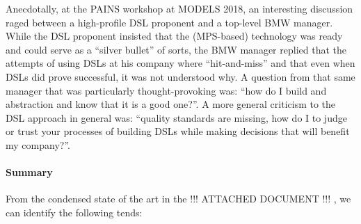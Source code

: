 \documentclass{article}
\begin{document}
% 
 

Anecdotally, at the PAINS workshop at MODELS 2018, an interesting discussion
raged between a high-profile DSL proponent and a top-level BMW manager. While
the DSL proponent insisted that the (MPS-based) technology was ready and could
serve as a ``silver bullet'' of sorts, the BMW manager replied that the attempts of using
DSLs at his company where ``hit-and-miss'' and that even when DSLs did prove
successful, it was not understood why. A question from that same manager that
was particularly thought-provoking was: ``how do I build and abstraction and
know that it is a good one?''. A more general criticism to the DSL approach in
general was: ``quality standards are missing, how do I to judge or trust your
processes of building DSLs while making decisions that will benefit my company?''.

\paragraph{Summary}
From the condensed state of the art in the !!! ATTACHED DOCUMENT !!! , we can
identify the following tends:
\end{document}
